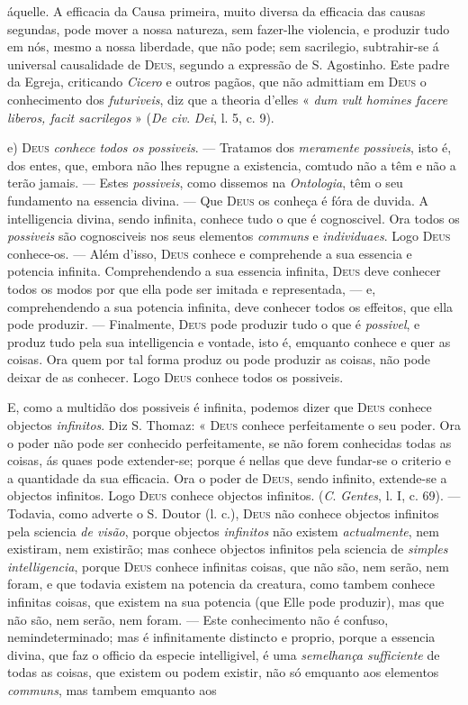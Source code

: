 áquelle. A efficacia da Causa primeira, muito diversa da efficacia das causas segundas, pode mover a nossa natureza, sem fazer-lhe violencia, e produzir tudo em nós, mesmo a nossa liberdade, que não pode; sem sacrilegio, subtrahir-se á universal causalidade de \textsc{Deus}, segundo a expressão de S. Agostinho. Este padre da Egreja, criticando \emph{Cicero} e outros pagãos, que não admittiam em \textsc{Deus} o conhecimento dos \emph{futuriveis}, diz que a theoria d'elles « \emph{dum vult homines facere liberos, facit sacrilegos} » (\emph{De civ}. \emph{Dei}, l. 5, c. 9).\par e) \textsc{Deus} \emph{conhece todos os possiveis}. --- Tratamos dos \emph{meramente possiveis}, isto é, dos entes, que, embora não lhes repugne a existencia, comtudo não a têm e não a terão jamais. --- Estes \emph{possiveis}, como dissemos na \emph{Ontologia}, têm o seu fundamento na essencia divina. --- Que \textsc{Deus} os conheça é fóra de duvida. A intelligencia divina, sendo infinita, conhece tudo o que é cognoscivel. Ora todos os \emph{possiveis} são cognosciveis nos seus elementos \emph{communs} e \emph{individuaes}. Logo \textsc{Deus} conhece-os. --- Além d'isso, \textsc{Deus} conhece e comprehende a sua essencia e potencia infinita. Comprehendendo a sua essencia infinita, \textsc{Deus} deve conhecer todos os modos por que ella pode ser imitada e representada, --- e, comprehendendo a sua potencia infinita, deve conhecer todos os effeitos, que ella pode produzir. --- Finalmente, \textsc{Deus} pode produzir tudo o que é \emph{possivel}, e produz tudo pela sua intelligencia e vontade, isto é, emquanto conhece e quer as coisas. Ora quem por tal forma produz ou pode produzir as coisas, não pode deixar de as conhecer. Logo \textsc{Deus} conhece todos os possiveis.\par E, como a multidão dos possiveis é infinita, podemos dizer que \textsc{Deus} conhece objectos \emph{infinitos}. Diz S. Thomaz: « \textsc{Deus} conhece perfeitamente o seu poder. Ora o poder não pode ser conhecido perfeitamente, se não forem conhecidas todas as coisas, ás quaes pode extender-se; porque é nellas que deve fundar-se o criterio e a quantidade da sua efficacia. Ora o poder de \textsc{Deus}, sendo infinito, extende-se a objectos infinitos. Logo \textsc{Deus} conhece objectos infinitos. (\emph{C}. \emph{Gentes}, l. I, c. 69). --- Todavia, como adverte o S. Doutor (l. c.), \textsc{Deus} não conhece objectos infinitos pela sciencia \emph{de visão}, porque objectos \emph{infinitos} não existem \emph{actualmente}, nem existiram, nem existirão; mas conhece objectos infinitos pela sciencia de \emph{simples intelligencia}, porque \textsc{Deus} conhece infinitas coisas, que não são, nem serão, nem foram, e que todavia existem na potencia da creatura, como tambem conhece infinitas coisas, que existem na sua potencia (que Elle pode produzir), mas que não são, nem serão, nem foram. --- Este conhecimento não é confuso, nemindeterminado; mas é infinitamente distincto e proprio, porque a essencia divina, que faz o officio da especie intelligivel, é uma \emph{semelhança sufficiente} de todas as coisas, que existem ou podem existir, não só emquanto aos elementos \emph{communs}, mas tambem emquanto aos 